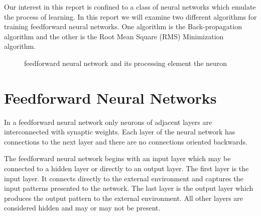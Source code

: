 \documentclass[11pt]{article}
\begin{document}
Our interest in this report is confined to a class of neural networks which emulate the process of learning. In this report we will
examine two different algorithms for training feedforward neural networks. One algorithm is the Back-propagation algorithm and the other
is the Root Mean Square (RMS) Minimization algorithm.

\begin{figure}[]
	\centering
		\caption{feedforward neural network and its processing element the neuron}
	\label{fig:figures_ffwdnn_Neuron}	
\end{figure}

\section{Feedforward Neural Networks} %
\label{sec:feedforward_neural_networks}

In a feedforward neural network only neurons of adjacent layers are interconnected with synaptic weights. Each layer of the neural
network has connections to the next layer and there are no connections oriented backwards.

The feedforward neural network begins with an input layer which may be connected to a hidden layer or directly to an output layer. The
first layer is the input layer. It connects directly to the external environment and captures the input patterns presented to the
network. The last layer is the output layer which produces the output pattern to the external environment. All other layers are
considered hidden and may or may not be present.
\end{document}
